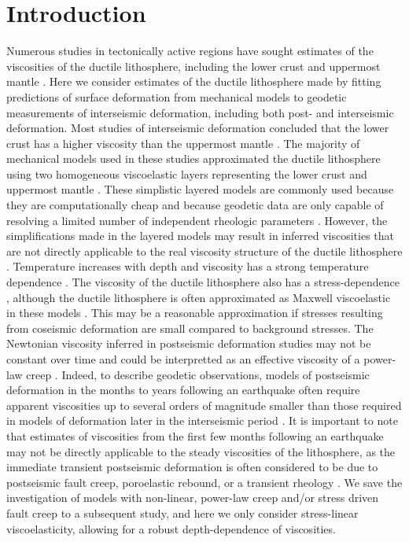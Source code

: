 \section{Introduction}
Numerous studies in tectonically active regions have sought estimates of the viscosities of the ductile lithosphere, including the lower crust and uppermost mantle \citep[{\it e.g.},][]{Hetland2003,Pollitz2003,Pollitz2005,Johnson2007,Hearn2009}. Here we consider estimates of the ductile lithosphere made by fitting predictions of surface deformation from mechanical models to geodetic measurements of interseismic deformation, including both post- and interseismic deformation.  Most studies of interseismic deformation concluded that the lower crust has a higher viscosity than the uppermost mantle \citep{Burgmann2008,Thatcher2008}. The majority of mechanical models used in these studies approximated the ductile lithosphere using two homogeneous viscoelastic layers representing the lower crust and uppermost mantle \citep[{\it e.g.},][]{Hetland2003,Pollitz2003,Hearn2009}. These simplistic layered models are commonly used because they are computationally cheap and because geodetic data are only capable of resolving a limited number of independent rheologic parameters \citep[{\it e.g.},][]{Riva2009,Pollitz2010}.  However, the simplifications made in the layered models may result in inferred viscosities that are not directly applicable to the real viscosity structure of the ductile lithosphere \citep{Riva2009}.
Temperature increases with depth and viscosity has a strong temperature dependence \citep[{\it e.g.},][]{Kohlstedt1995}.  The viscosity of the ductile lithosphere also has a stress-dependence \citep[{\it e.g.},][]{Kohlstedt1995}, although  the ductile lithosphere is often approximated as Maxwell viscoelastic in these models \citep[{\it e.g.},][]{Hetland2003,Johnson2007,Riva2009, Yamasaki2012a}.  This may be a reasonable approximation if stresses resulting from coseismic deformation are small compared to background stresses.  The Newtonian viscosity inferred in postseismic deformation studies may not be constant over time and could be interpretted as an effective viscosity of a power-law creep \citep[{\it e.g.},][]{Freed2006b}. Indeed, to describe geodetic observations, models of postseismic deformation in the months to years following an earthquake often require apparent viscosities up to several orders of magnitude smaller than those required in models of deformation later in the interseismic period \citep[{\it e.g.},][]{Pollitz2005,Johnson2007,Meade2013}. It is important to note that estimates of viscosities from the first few months following an earthquake may not be directly applicable to the steady viscosities of the lithosphere, as the immediate transient postseismic deformation is often considered to be due to postseismic fault creep, poroelastic rebound, or a transient rheology \citep[{\it e.g.},][]{Pollitz2003,Freed2006b,Hearn2009}. We save the investigation of models with non-linear, power-law creep and/or stress driven fault creep to a subsequent study, and here we only consider stress-linear viscoelasticity, allowing for a robust depth-dependence of viscosities.

